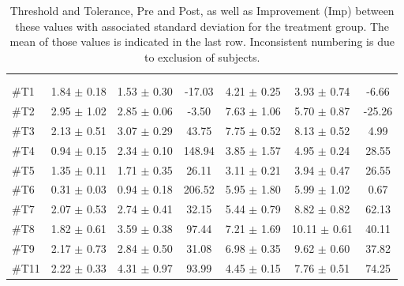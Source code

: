 \begin{longtable} {l|c|c|c|c|c|c}
	\caption{Threshold and Tolerance, Pre and Post, as well as Improvement (Imp) between these values with associated standard deviation for the treatment group. The mean of those values is indicated in the last row. Inconsistent numbering is due to exclusion of subjects.}
	\label{tab:Treatment} \\
\cellcolor[HTML]{C0C0C0} {} & 
\multicolumn{3}{c|}{ \cellcolor[HTML]{C0C0C0}{\textbf{Threshold}}} & \multicolumn{3}{c}{ \cellcolor[HTML]{C0C0C0}{\textbf{Tolerance}}}  	\\  \rule{0pt}{3ex} 
  \cellcolor[HTML]{C0C0C0}{} &
 \multicolumn{1}{c|}{ \cellcolor[HTML]{C0C0C0}{Pre [kgF]}} & \multicolumn{1}{c|}{ \cellcolor[HTML]{C0C0C0}{Post [kgF]}} &
 \multicolumn{1}{c|}{ \cellcolor[HTML]{C0C0C0}{Imp [\%]}} 
 & \multicolumn{1}{|c|}{ \cellcolor[HTML]{C0C0C0}{Pre [kgF]}} 
 & \multicolumn{1}{c|}{ \cellcolor[HTML]{C0C0C0}{Post [kgF]}} 
 & \multicolumn{1}{c|}{ \cellcolor[HTML]{C0C0C0}{Imp [\%]}} 
 	\\ \hline 
\#T1 & 1.84 $\pm$ 0.18 & 1.53 $\pm$ 0.30 & -17.03
& 4.21 $\pm$ 0.25 & 3.93 $\pm$ 0.74 & -6.66\\ \hline
\#T2 & 2.95 $\pm$ 1.02 & 2.85 $\pm$ 0.06 & -3.50 & 7.63 $\pm$ 1.06  & 5.70 $\pm$ 0.87 & -25.26\\ \hline
\#T3 & 2.13 $\pm$ 0.51 & 3.07 $\pm$ 0.29 & 43.75 & 7.75 $\pm$ 0.52 & 8.13 $\pm$ 0.52 & 4.99 \\ \hline
\#T4 & 0.94 $\pm$ 0.15 & 2.34 $\pm$ 0.10 & 148.94 & 3.85 $\pm$ 1.57 & 4.95 $\pm$ 0.24 & 28.55\\ \hline
\#T5 & 1.35 $\pm$ 0.11 & 1.71 $\pm$ 0.35 & 26.11 & 3.11 $\pm$ 0.21  & 3.94 $\pm$ 0.47 & 26.55 \\ \hline	
\#T6 & 0.31 $\pm$ 0.03 & 0.94 $\pm$ 0.18 & 206.52 & 5.95 $\pm$ 1.80 & 5.99 $\pm$  1.02 & 0.67\\ \hline
\#T7 & 2.07 $\pm$ 0.53 & 2.74 $\pm$ 0.41 & 32.15 & 5.44 $\pm$ 0.79 & 8.82 $\pm$ 0.82 & 62.13  \\ \hline
\#T8 & 1.82 $\pm$ 0.61 & 3.59 $\pm$ 0.38 & 97.44 & 7.21 $\pm$ 1.69 & 10.11 $\pm$ 0.61 & 40.11 \\ \hline
\#T9 & 2.17 $\pm$ 0.73 & 2.84 $\pm$ 0.50 & 31.08 & 6.98 $\pm$  0.35 & 9.62 $\pm$ 0.60 & 37.82 \\ \hline
\#T11 & 2.22 $\pm$ 0.33 & 4.31 $\pm$ 0.97 & 93.99 & 4.45 $\pm$ 0.15 & 7.76 $\pm$  0.51 & 74.25 \\ \hline

\end{longtable}
